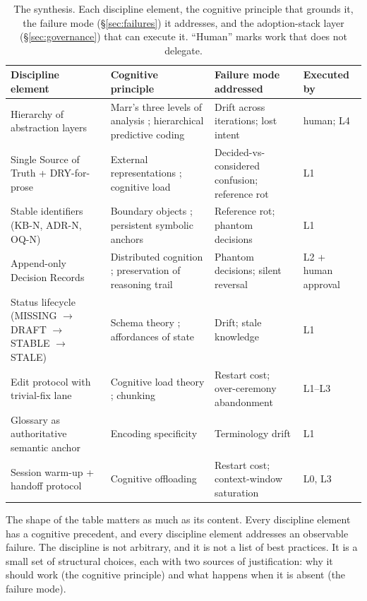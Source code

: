 \documentclass[11pt,a4paper,twocolumn]{article}
\begin{document}
\begin{table}[t]
\centering
\small
\begin{tabular}{p{3.5cm} p{4.9cm} p{4.2cm} p{1.9cm}}
\toprule
\textbf{Discipline element} & \textbf{Cognitive principle} & \textbf{Failure mode addressed} & \textbf{Executed by} \\
\midrule
Hierarchy of abstraction layers & Marr's three levels of analysis \citep{marr1982vision}; hierarchical predictive coding \citep{clark2013whatever} & Drift across iterations; lost intent & human; L4 \\
Single Source of Truth + DRY-for-prose & External representations \citep{scaife1996external}; cognitive load \citep{sweller1988cognitive} & Decided-vs-considered confusion; reference rot & L1 \\
Stable identifiers (KB-N, ADR-N, OQ-N) & Boundary objects \citep{star1989boundary}; persistent symbolic anchors & Reference rot; phantom decisions & L1 \\
Append-only Decision Records & Distributed cognition \citep{hutchins1995}; preservation of reasoning trail & Phantom decisions; silent reversal & L2 + human approval \\
Status lifecycle (MISSING $\to$ DRAFT $\to$ STABLE $\to$ STALE) & Schema theory \citep{bartlett1932remembering}; affordances of state & Drift; stale knowledge & L1 \\
Edit protocol with trivial-fix lane & Cognitive load theory \citep{sweller1988cognitive}; chunking \citep{miller1956magical, cowan2001magical} & Restart cost; over-ceremony abandonment & L1--L3 \\
Glossary as authoritative semantic anchor & Encoding specificity \citep{tulving1973encoding} & Terminology drift & L1 \\
Session warm-up + handoff protocol & Cognitive offloading \citep{risko2016offloading} & Restart cost; context-window saturation & L0, L3 \\
\bottomrule
\end{tabular}
\caption{The synthesis. Each discipline element, the cognitive
principle that grounds it, the failure mode (\S\ref{sec:failures})
it addresses, and the adoption-stack layer (\S\ref{sec:governance})
that can execute it. ``Human'' marks work that does not delegate.}
\label{tab:synthesis}
\end{table}

The shape of the table matters as much as its content. Every
discipline element has a cognitive precedent, and every discipline
element addresses an observable failure. The discipline is not
arbitrary, and it is not a list of best practices. It is a small
set of structural choices, each with two sources of justification:
why it should work (the cognitive principle) and what happens when
it is absent (the failure mode).
\end{document}
